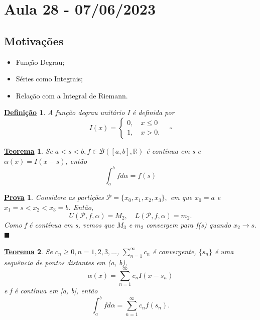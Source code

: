 \documentclass{article}
\newtheorem*{def*}{\underline{Defini\c c\~ao}}
\newtheorem*{theorem*}{\underline{Teorema}}
\newtheorem*{proof*}{\underline{Prova}}
\renewcommand\qedsymbol{$\blacksquare$}
\begin{document}
\section{Aula 28 - 07/06/2023}
\subsection{Motivações} 
\begin{itemize}
  \item Função Degrau; 
  \item Séries como Integrais; 
  \item Relação com a Integral de Riemann.
\end{itemize}
\begin{def*}
  A função degrau unitário I é definida por 
    \[
      I(x) = \left\{\begin{array}{ll}
          0,\quad x\leq 0\\ 
          1,\quad x > 0.
        \end{array}\right.\quad \square
    \] 
\end{def*}
\begin{theorem*}
  Se \(a < s < b, f\in \mathcal{B}([a, b], \mathbb{R})\) é contínua em s e \(\alpha (x) = I(x-s)\), então 
    \[           
      \int_{a}^{b} f d\alpha = f(s)
    \]
\end{theorem*}
\begin{proof*}
  Considere as partições \(\mathcal{P} = \{x_{0}, x_1, x_2, x_3\},\) em que \(x_{0} = a\) e \(x_1 = s < x_2 < x_3 = b\). Então,
    \[
      U(\mathcal{P}, f, \alpha ) = M_{2}, \quad L(\mathcal{P}, f, \alpha ) = m_{2}.
    \]
  Como f é contínua em s, vemos que \(M_3\) e \(m_2\) convergem para f(s) quando \(x_2\to s.\) \qedsymbol
\end{proof*}
\begin{theorem*}
  Se \(c_{n}\geq 0, n = 1, 2, 3, \dotsc \), \(\sum\limits_{n=1}^{\infty}c_{n}\) é convergente, \(\{s_{n}\}\) é uma sequência de pontos distantes em (a, b), 
    \[
      \alpha (x) = \sum\limits_{n=1}^{\infty}c_{n}I(x-s_{n})
    \]
  e f é contínua em [a, b], então 
    \[
      \int_{a}^{b}f d\alpha  = \sum\limits_{n=1}^{\infty}c_{n}f(s_{n}).
    \]
\end{theorem*}
\end{document}
